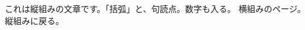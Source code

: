 \documentclass{article}
\begin{document}
\edef\x{\the\dimexpr\ptjcharheight+\ptjchardepth\relax}
\ifdim\x=10pt \typeout{PTJTEST-PASS: char cell 1zw}\else\typeout{PTJTEST-FAIL: char cell \x}\fi
{}\hbox{}
\ifdim\wd0=10pt \typeout{PTJTEST-PASS: tcy advance}\else\typeout{PTJTEST-FAIL: tcy advance \the\wd0}\fi
これは縦組みの文章です。「括弧」と、句読点。数字も入る。
\ptjyokopage
{}
横組みのページ。
\ptjtatepage
縦組みに戻る。
\end{document}

